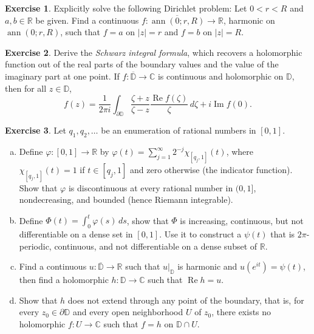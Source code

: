 \documentclass[12pt,openany]{book}
\newcommand{\ann}{\operatorname{ann}}
\renewcommand{\Re}{\operatorname{Re}}
\renewcommand{\Im}{\operatorname{Im}}
\newcommand{\sabs}[1]{\lvert {#1} \rvert}
\newcommand{\C}{{\mathbb{C}}}
\newcommand{\R}{{\mathbb{R}}}
\newcommand{\D}{{\mathbb{D}}}
\newcommand{\myindex}[1]{#1\index{#1}}
\theoremstyle{plain}
\theoremstyle{remark}
\theoremstyle{definition}
\newenvironment{exbox}{%
    \def\FrameCommand{\vrule width 1pt \relax\hspace{10pt}}%
    \MakeFramed{\advance\hsize-\width\FrameRestore}%
}{%
    \endMakeFramed
}
\newenvironment{exparts}{%
    \leavevmode\begin{enumerate}[a),noitemsep,topsep=0pt,parsep=0pt,partopsep=0pt]
}{%
    \end{enumerate}
}
\theoremstyle{exercise}
\newtheorem{exercise}{Exercise}[section]
\theoremstyle{example}
\begin{document}
\begin{exbox}
\begin{exercise}
Explicitly solve the following Dirichlet problem:  Let $0 < r < R$ and $a,b
\in \R$ be given.  Find a continuous $f \colon \overline{\ann(0;r,R)} \to
\R$, harmonic on $\ann(0;r,R)$, such that $f=a$ on $\sabs{z}=r$ and $f=b$
on $\sabs{z}=R$.
\end{exercise}

\begin{exercise}
Derive the \emph{\myindex{Schwarz integral formula}}, which recovers
a holomorphic function out of the real parts of the boundary values
and the value of the imaginary part at one point.
If $f \colon \overline{\D} \to \C$ is continuous and holomorphic on
$\D$, then for all $z \in \D$,
\begin{equation*}
f(z) =
\frac{1}{2\pi i}
\int_{\partial \D}
\frac{\zeta+z}{\zeta-z} \frac{\Re f(\zeta)}{\zeta} \, d\zeta
+ i \Im f(0) .
\end{equation*}
\end{exercise}

\begin{exercise}
Let $q_1,q_2,\ldots$ be an enumeration of rational
numbers in $[0,1]$.
\begin{exparts}
\item
Define $\varphi \colon [0,1] \to {\mathbb R}$
by $\varphi(t) = \sum_{j=1}^\infty 2^{-j} \chi_{[q_j,1]}(t)$,
where $\chi_{[q_j,1]}(t) = 1$ if $t \in [q_j,1]$ and
zero otherwise (the indicator function).  Show that
$\varphi$ is discontinuous at every rational number in $(0,1]$,
nondecreasing, and bounded (hence Riemann integrable).
\item
Define $\Phi(t) = \int_0^t \varphi(s)\, ds$, show that $\Phi$
is increasing, continuous, but not differentiable
on a dense set in $[0,1]$.  Use it to construct a
$\psi(t)$ that is $2\pi$-periodic, continuous, and 
not differentiable on a dense subset of $\R$.
\item
Find a continuous $u \colon \overline{\D} \to \R$
such that $u|_{\D}$ is harmonic and
$u(e^{it}) = \psi(t)$, then find a holomorphic $h \colon \D \to \C$
such that $\Re h = u$.
\item
Show that $h$ does not extend through any point of
the boundary, that is, for every
$z_0 \in \partial \D$ and every open neighborhood
$U$ of $z_0$, there exists no holomorphic $f \colon U \to \C$
such that $f = h$ on $\D \cap U$.
\end{exparts}
\end{exercise}
\end{exbox}
\end{document}
